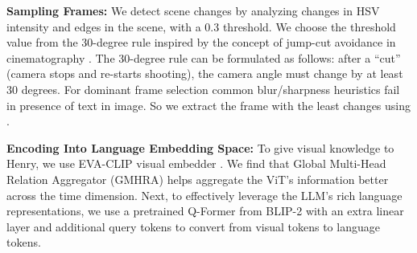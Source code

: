 \textbf{Sampling Frames:} %
We detect scene changes by analyzing changes in HSV intensity and edges in the scene, with a 0.3 threshold. We choose the threshold value from the 30-degree rule inspired by the concept of jump-cut avoidance in cinematography \cite{arev2014automatic,friedman2004knowledge}. The 30-degree rule can be formulated as follows: after a ``cut'' (camera stops and re-starts shooting), the camera angle must change by at least 30 degrees.
For dominant frame selection common blur/sharpness heuristics fail in presence of text in image. So we extract the frame with the least changes using \cite{xu2022gmflow}.



\textbf{Encoding Into Language Embedding Space:} To give visual knowledge to Henry, we use EVA-CLIP visual embedder \cite{sun2023eva}. We find that Global Multi-Head Relation Aggregator (GMHRA) \cite{li2021uniformer} helps aggregate the ViT's information better across the time dimension. Next, to effectively leverage the LLM's rich language representations, we use a pretrained Q-Former from BLIP-2 \cite{li2023blip} with an extra linear layer and additional query tokens to convert from visual tokens to language tokens.






